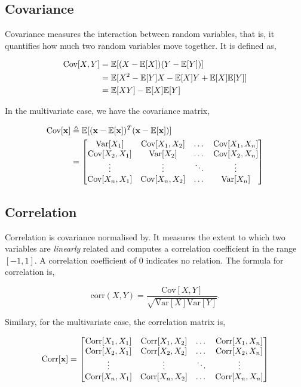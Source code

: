 \documentclass[11pt]{amsart}
\begin{document}
\subsection{Covariance}

Covariance measures the interaction between random variables, that is, it quantifies how much two random variables move together. It is defined as,

\begin{align}
\text{Cov}[X, Y] &= \mathbb{E}[(X - \mathbb{E}[X])(Y - \mathbb{E}[Y])] \notag \\
&= \mathbb{E}[X^2 - \mathbb{E}[Y]X - \mathbb{E}[X]Y + \mathbb{E}[X]\mathbb{E}[Y]] \notag \\
&= \mathbb{E}[XY] - \mathbb{E}[X]\mathbb{E}[Y] \notag
\end{align}

In the multivariate case, we have the covariance matrix,

\begin{align}
\text{Cov}[\mathbf{x}] &\triangleq \mathbb{E}[(\mathbf{x} - \mathbb{E}[\mathbf{x}])^T(\mathbf{x} - \mathbb{E}[\mathbf{x}])] \notag \\
&= \begin{bmatrix}
\text{Var}[X_1] & \text{Cov}[X_1, X_2] & \dots & \text{Cov}[X_1, X_n] \\
\text{Cov}[X_2, X_1] & \text{Var}[X_2] & \dots & \text{Cov}[X_2, X_n] \\
\vdots & \vdots & \ddots & \vdots \\
\text{Cov}[X_n, X_1] & \text{Cov}[X_n, X_2] &\dots & \text{Var}[X_n]
\end{bmatrix} \notag
\end{align}

\subsection{Correlation}

Correlation is covariance normalised by. It measures the extent to which two variables are \emph{linearly} related and computes a correlation coefficient in the range $[-1, 1]$. A correlation coefficient of 0 indicates no relation. The formula for correlation is,

$$\text{corr}(X, Y) = \frac{\text{Cov}[X, Y]}{\sqrt{\text{Var}[X]\text{Var}[Y]}}.$$

Similary, for the multivariate case, the correlation matrix is,

$$
\text{Corr}[\mathbf{x}] = \begin{bmatrix}
\text{Corr}[X_1, X_1] & \text{Corr}[X_1, X_2] & \dots & \text{Corr}[X_1, X_n] \\
\text{Corr}[X_2, X_1] & \text{Corr}[X_2, X_2] & \dots & \text{Corr}[X_2, X_n] \\
\vdots & \vdots & \ddots & \vdots \\
\text{Corr}[X_n, X_1] & \text{Corr}[X_n, X_2] &\dots & \text{Corr}[X_n, X_n]
\end{bmatrix} \notag
$$
\end{document}
